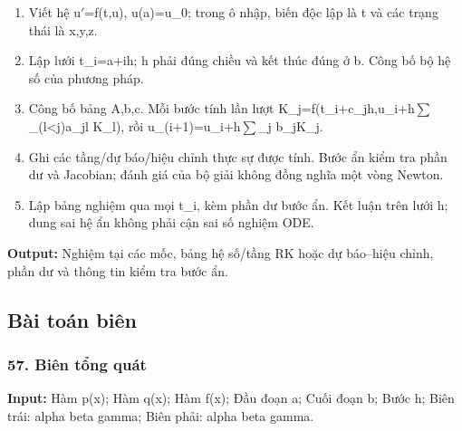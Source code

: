 \begin{enumerate}

\item Viết hệ u\ensuremath{\prime}=\allowbreak{}f(\allowbreak{}t,\allowbreak{}u),\allowbreak{} u(\allowbreak{}a)=\allowbreak{}u\_0;\allowbreak{} trong ô nhập,\allowbreak{} biến độc lập là t và các trạng thái là x,\allowbreak{}y,\allowbreak{}z.

\item Lập lưới t\_i=\allowbreak{}a+\allowbreak{}ih;\allowbreak{} h phải đúng chiều và kết thúc đúng ở b. Công bố bộ hệ số của phương pháp.

\item Công bố bảng A,\allowbreak{}b,\allowbreak{}c. Mỗi bước tính lần lượt K\_j=\allowbreak{}f(\allowbreak{}t\_i+\allowbreak{}c\_jh,\allowbreak{}u\_i+\allowbreak{}h\ensuremath{\sum}\_(\allowbreak{}l<j)a\_jl K\_l),\allowbreak{} rồi u\_(\allowbreak{}i+\allowbreak{}1)=\allowbreak{}u\_i+\allowbreak{}h\ensuremath{\sum}\_j b\_jK\_j.

\item Ghi các tầng/\allowbreak{}dự báo/\allowbreak{}hiệu chỉnh thực sự được tính. Bước ẩn kiểm tra phần dư và Jacobian;\allowbreak{} đánh giá của bộ giải không đồng nghĩa một vòng Newton.

\item Lập bảng nghiệm qua mọi t\_i,\allowbreak{} kèm phần dư bước ẩn. Kết luận trên lưới h;\allowbreak{} dung sai hệ ẩn không phải cận sai số nghiệm ODE.

\end{enumerate}

\textbf{Output:} Nghiệm tại các mốc,\allowbreak{} bảng hệ số/\allowbreak{}tầng RK hoặc dự báo–hiệu chỉnh,\allowbreak{} phần dư và thông tin kiểm tra bước ẩn.

\subsection{Bài toán biên}

\examplebreak\subsubsection*{57. Biên tổng quát}

\textbf{Input:} Hàm p(\allowbreak{}x);\allowbreak{} Hàm q(\allowbreak{}x);\allowbreak{} Hàm f(\allowbreak{}x);\allowbreak{} Đầu đoạn a;\allowbreak{} Cuối đoạn b;\allowbreak{} Bước h;\allowbreak{} Biên trái: alpha beta gamma;\allowbreak{} Biên phải: alpha beta gamma.

